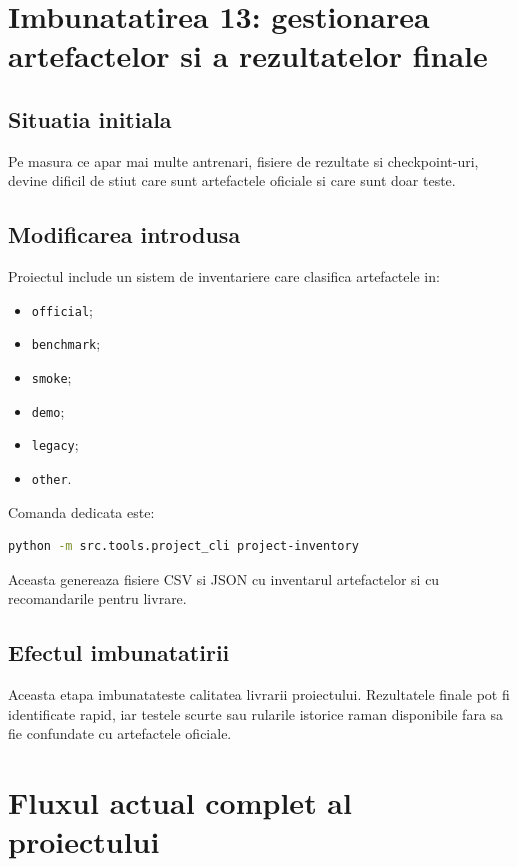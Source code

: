 \documentclass[12pt,a4paper]{article}
\begin{document}
\section{Imbunatatirea 13: gestionarea artefactelor si a rezultatelor finale}

\subsection{Situatia initiala}

Pe masura ce apar mai multe antrenari, fisiere de rezultate si checkpoint-uri,
devine dificil de stiut care sunt artefactele oficiale si care sunt doar teste.

\subsection{Modificarea introdusa}

Proiectul include un sistem de inventariere care clasifica artefactele in:

\begin{itemize}
    \item \texttt{official};
    \item \texttt{benchmark};
    \item \texttt{smoke};
    \item \texttt{demo};
    \item \texttt{legacy};
    \item \texttt{other}.
\end{itemize}

Comanda dedicata este:

\begin{lstlisting}[language=bash]
python -m src.tools.project_cli project-inventory
\end{lstlisting}

Aceasta genereaza fisiere CSV si JSON cu inventarul artefactelor si cu
recomandarile pentru livrare.

\subsection{Efectul imbunatatirii}

Aceasta etapa imbunatateste calitatea livrarii proiectului. Rezultatele finale pot
fi identificate rapid, iar testele scurte sau rularile istorice raman disponibile
fara sa fie confundate cu artefactele oficiale.

\section{Fluxul actual complet al proiectului}
\end{document}
